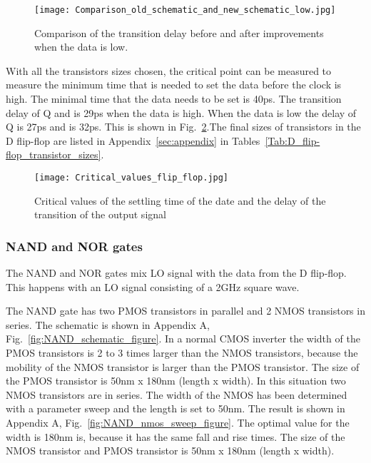 \begin{figure}[h]
\texttt{[image: Comparison\_old\_schematic\_and\_new\_schematic\_low.jpg]}
\caption{ Comparison of the transition delay before and after improvements when the data is low.}
\label{fig:Comparison_old_schematic_and_new_schematic_low_figure}
\end{figure}

With all the transistors sizes chosen, the critical point can be measured to measure the minimum time that is needed to set the data before the clock is high. The minimal time that the data needs to be set is 40ps. The transition delay of Q and  is 29ps when the data is high. When the data is low the delay of Q is 27ps and  is 32ps. This is shown in Fig.~\ref{fig:Critical_values_flip_flop_figure}.The final sizes of transistors in the D flip-flop are listed in Appendix~\ref{sec:appendix} in Tables~\ref{Tab:D_flip-flop_transistor_sizes}.

\begin{figure}[h]
\texttt{[image: Critical\_values\_flip\_flop.jpg]}
\caption{ Critical values of the settling time of the date and the delay of the transition of the output signal}
\label{fig:Critical_values_flip_flop_figure}
\end{figure}

\subsubsection{NAND and NOR gates}\label{sec:frontend}
The NAND and NOR gates mix LO signal with the data from the D flip-flop. This happens with an LO signal consisting of a 2GHz square wave.

The NAND gate has two PMOS transistors in parallel and 2 NMOS transistors in series. The schematic is shown in Appendix A, Fig.~\ref{fig:NAND_schematic_figure}. In a normal CMOS inverter the width of the PMOS transistors is 2 to 3 times larger than the NMOS transistors, because the mobility of the NMOS transistor is larger than the PMOS transistor. The size of the PMOS transistor is 50nm x 180nm (length x width). In this situation two NMOS transistors are in series. The width of the NMOS has been determined with a parameter sweep and the length is set to 50nm. The result is shown in Appendix A, Fig.~\ref{fig:NAND_nmos_sweep_figure}. The optimal value for the width is 180nm is, because it has the same fall and rise times. The size of the NMOS transistor and PMOS transistor is 50nm x 180nm (length x width).

